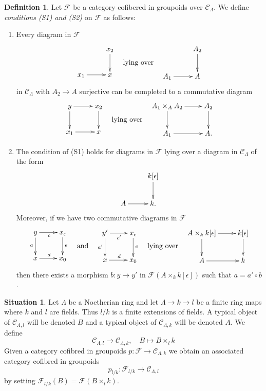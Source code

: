 \documentclass{amsart}
\theoremstyle{plain}
\theoremstyle{definition}
\newtheorem{definition}[subsection]{Definition}
\newtheorem{situation}[subsection]{Situation}
\theoremstyle{remark}
\numberwithin{equation}{subsection}
\begin{document}
\begin{definition}
\label{definition-S1-S2}
Let $\mathcal{F}$ be a category cofibered in groupoids over $\mathcal
C_\Lambda$. We define {\it conditions (S1) and (S2)}
on $\mathcal{F}$ as follows:
\begin{enumerate}
\item[(S1)] Every diagram in $\mathcal{F}$
$$
\vcenter{
\xymatrix{
           & x_2 \ar[d] \\
x_1 \ar[r] & x
}
}
\quad\text{lying over}\quad
\vcenter{
\xymatrix{
           & A_2 \ar[d] \\
A_1 \ar[r] & A
}
}
$$
in $\mathcal{C}_\Lambda$ with $A_2 \to A$ surjective can be completed
to a commutative diagram
$$
\vcenter{
\xymatrix{
y \ar[r] \ar[d] & x_2 \ar[d] \\
x_1 \ar[r]      & x
}
}
\quad\text{lying over}\quad
\vcenter{
\xymatrix{
A_1 \times_A A_2 \ar[r] \ar[d] & A_2 \ar[d] \\
A_1 \ar[r]      & A.
}
}
$$
\item[(S2)]
The condition of (S1) holds for diagrams in $\mathcal{F}$ lying over
a diagram in $\mathcal{C}_\Lambda$ of the form
$$
\xymatrix{
          & k[\epsilon] \ar[d] \\
A  \ar[r] & k.
}
$$
Moreover, if we have two commutative diagrams in $\mathcal{F}$
$$
\vcenter{
\xymatrix{
y \ar[r]_c \ar[d]_a & x_\epsilon \ar[d]^e \\
x \ar[r]^d          & x_0
}
}
\quad\text{and}\quad
\vcenter{
\xymatrix{
y' \ar[r]_{c'} \ar[d]_{a'} & x_\epsilon \ar[d]^e \\
x \ar[r]^d                 & x_0
}
}
\quad\text{lying over}\quad
\vcenter{
\xymatrix{
A \times_k k[\epsilon] \ar[r] \ar[d] & k[\epsilon] \ar[d] \\
A  \ar[r] & k
}
}
$$
then there exists a morphism $b : y \to y'$ in
$\mathcal{F}(A \times_k k[\epsilon])$ such that $a = a' \circ b$.
\end{enumerate}
\end{definition}

\begin{situation}
\label{situation-change-of-fields}
Let $\Lambda$ be a Noetherian ring and let $\Lambda \to k \to l$ be a finite
ring maps where $k$ and $l$ are fields. Thus $l/k$ is a finite
extensions of fields. A typical object of $\mathcal{C}_{\Lambda, l}$ will be
denoted $B$ and a typical object of $\mathcal{C}_{\Lambda, k}$ will be
denoted $A$. We define
\begin{equation}
\label{equation-comparison}
\mathcal{C}_{\Lambda, l} \longrightarrow \mathcal{C}_{\Lambda, k},
\quad
B \longmapsto B \times_l k
\end{equation}
Given a category cofibred in groupoids
$p : \mathcal{F} \to \mathcal{C}_{\Lambda, k}$ we obtain
an associated category cofibred in groupoids
$$
p_{l/k} : \mathcal{F}_{l/k} \longrightarrow \mathcal{C}_{\Lambda, l}
$$
by setting $\mathcal{F}_{l/k}(B) = \mathcal{F}(B \times_l k)$.
\end{situation}
\end{document}
